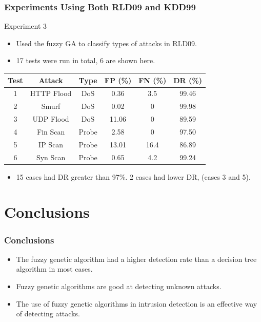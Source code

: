\documentclass{beamer}
\begin{document}
\begin{frame}
	\frametitle{Experiments Using Both RLD09 and KDD99}
Experiment 3
	\begin{itemize}
		\item Used the fuzzy GA to classify types of attacks in RLD09.
		\item 17 tests were run in total, 6 are shown here.
	\end{itemize}
\begin{table}
\begin{tabular}{cccccc}
Test & Attack & Type & FP (\%) & FN (\%) & DR (\%)\\ \hline
1 & HTTP Flood & DoS & 0.36 & 3.5 & 99.46\\
2 & Smurf & DoS & 0.02 & 0 & 99.98\\
3 & UDP Flood & DoS & 11.06 & 0 & 89.59\\
4 & Fin Scan & Probe & 2.58 & 0 & 97.50\\
5 & IP Scan & Probe & 13.01 & 16.4 & 86.89\\
6 & Syn Scan & Probe & 0.65 & 4.2 & 99.24\\
\end{tabular}
\end{table}

\begin{itemize}
	\item 15 cases had DR greater than 97\%. 2 cases had lower DR, (cases 3 and 5).
\end{itemize}

\end{frame}
\section[Conclusions]{Conclusions}

\begin{frame}
\frametitle{Conclusions}
	\begin{itemize}
		\item The fuzzy genetic algorithm had a higher detection rate than a decision tree algorithm in most cases.
		\item Fuzzy genetic algorithms are good at detecting unknown attacks.
		\item The use of fuzzy genetic algorithms in intrusion detection is an effective way of detecting attacks.
	\end{itemize}
\end{frame}
\end{document}
